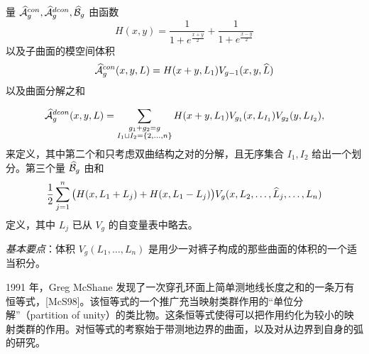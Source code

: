 量 $\widehat{\mathcal{A}}^{con}_g,\widehat{\mathcal{A}}^{dcon}_g,\widehat{\mathcal{B}}_g$ 由函数
\[
H(x,y)=\frac{1}{1+e^{\frac{x+y}{2}}}+\frac{1}{1+e^{\frac{x-y}{2}}}
\]
以及子曲面的模空间体积
\[
\widehat{\mathcal{A}}^{con}_g(x,y,L)=H(x+y,L_1)V_{g-1}(x,y,\widehat{L})
\]
以及曲面分解之和


\[
\widehat{\mathcal{A}}^{dcon}_g(x,y,L)=\sum_{\substack{g_1+g_2=g\\ I_1\sqcup I_2=\{2,\dots,n\}}}H(x+y,L_1)V_{g_1}(x,L_{I_1})V_{g_2}(y,L_{I_2}),
\]
来定义，其中第二个和只考虑双曲结构之对的分解，且无序集合 $I_1,I_2$ 给出一个划分。第三个量 $\widehat{\mathcal{B}}_g$ 由和
\[
\frac{1}{2}\sum_{j=1}^n\big(H(x,L_1+L_j)+H(x,L_1-L_j)\big)V_g(x,L_2,\dots,\widehat{L}_j,\dots,L_n)
\]
定义，其中 $L_j$ 已从 $V_g$ 的自变量表中略去。


\emph{基本要点}：体积 $V_g(L_1,\dots,L_n)$ 是用少一对裤子构成的那些曲面的体积的一个适当积分。


1991 年，Greg McShane 发现了一次穿孔环面上简单测地线长度之和的一条万有恒等式，[McS98]。该恒等式的一个推广充当映射类群作用的“单位分解”（partition of unity）的类比物。这条恒等式使得可以把作用约化为较小的映射类群的作用。对恒等式的考察始于带测地边界的曲面，以及对从边界到自身的弧的研究。

